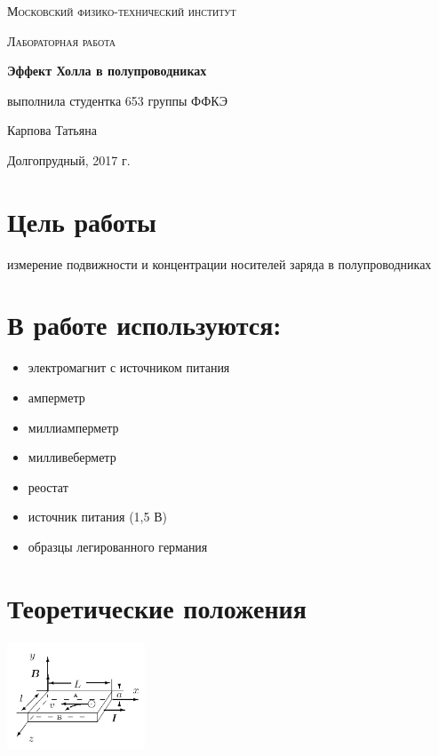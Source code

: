 \documentclass[a4paper]{article}
\begin{document}
\begin{titlepage}
	\centering
	\vspace{5cm}
	{\scshape\LARGE Московский физико-технический институт \par}
	\vspace{4cm}
	{\scshape\Large Лабораторная работа \par}
	\vspace{1cm}
	{\huge\bfseries Эффект Холла в полупроводниках \par}
	\vspace{1cm}
	\vfill
\begin{flushright}
	{\large выполнила студентка 653 группы ФФКЭ}\par
	\vspace{0.3cm}
	{\LARGE Карпова Татьяна}
\end{flushright}
	

	\vfill

	Долгопрудный, 2017 г.
\end{titlepage}

\section{Цель работы}
измерение подвижности и концентрации носителей заряда в полупроводниках

\section{В работе используются:}
\begin{itemize}
    \item электромагнит с источником питания
    \item амперметр
    \item миллиамперметр
    \item милливеберметр
    \item реостат
    \item источник питания (1,5 В)
    \item образцы легированного германия
\end{itemize}

\section{Теоретические положения}

\begin{floatingfigure}{41mm}
\noindent
\hfil
\includegraphics[width=41mm]{fig1.PNG}
\hfil
\caption{Образец с током в магнитном токе}
\label{figCurvesFF}
\end{floatingfigure}
\end{document}
